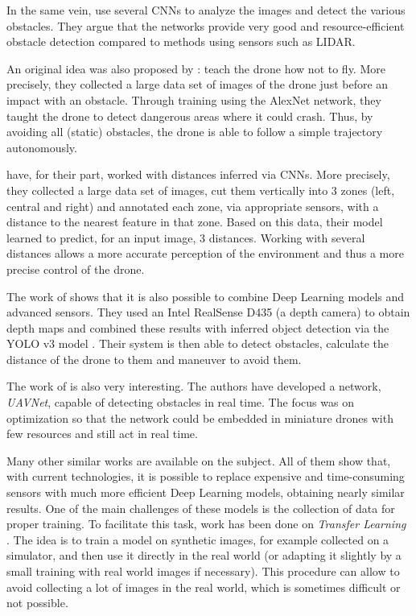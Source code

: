 In the same vein, \textcite{lee2021deep} use several CNNs to analyze the images and detect the various obstacles. They argue that the networks provide very good and resource-efficient obstacle detection compared to methods using sensors such as LIDAR.

An original idea was also proposed by \textcite{gandhi2017learning}: teach the drone how not to fly. More precisely, they collected a large data set of images of the drone just before an impact with an obstacle. Through training using the AlexNet \cite{krizhevsky2012imagenet} network, they taught the drone to detect dangerous areas where it could crash. Thus, by avoiding all (static) obstacles, the drone is able to follow a simple trajectory autonomously.

\textcite{kouris2018learning} have, for their part, worked with distances inferred via CNNs. More precisely, they collected a large data set of images, cut them vertically into 3 zones (left, central and right) and annotated each zone, via appropriate sensors, with a distance to the nearest feature in that zone. Based on this data, their model learned to predict, for an input image, 3 distances. Working with several distances allows a more accurate perception of the environment and thus a more precise control of the drone.

The work of \textcite{wang2020uav} shows that it is also possible to combine Deep Learning models and advanced sensors. They used an Intel RealSense D435 \cite{intel2021realsense} (a depth camera) to obtain depth maps and combined these results with inferred object detection via the YOLO v3 model \cite{redmon2018yolov3}. Their system is then able to detect obstacles, calculate the distance of the drone to them and maneuver to avoid them.

The work of \textcite{chen2018uavnet} is also very interesting. The authors have developed a network, \emph{UAVNet}, capable of detecting obstacles in real time. The focus was on optimization so that the network could be embedded in miniature drones with few resources and still act in real time.

Many other similar works are available on the subject. All of them show that, with current technologies, it is possible to replace expensive and time-consuming sensors with much more efficient Deep Learning models, obtaining nearly similar results. One of the main challenges of these models is the collection of data for proper training. To facilitate this task, work has been done on \emph{Transfer Learning} \cite{lu2017cultivated, kucuksubasi2018transfer}. The idea is to train a model on synthetic images, for example collected on a simulator, and then use it directly in the real world (or adapting it slightly by a small training with real world images if necessary). This procedure can allow to avoid collecting a lot of images in the real world, which is sometimes difficult or not possible.

